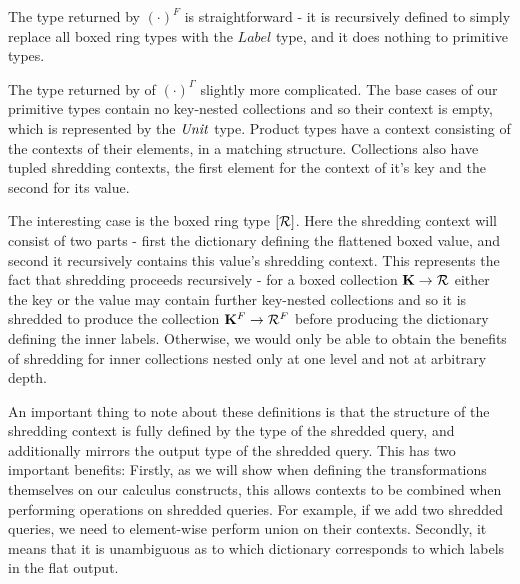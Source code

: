 {{{{The type returned by $(\cdot)^F$ is straightforward - it is recursively defined to simply replace all boxed ring types with the $Label$ type, and it does nothing to primitive types.

The type returned by of $(\cdot)^\Gamma$ slightly more complicated. The base cases of our primitive types contain no key-nested collections and so their context is empty, which is represented by the $\textrm{\textit{Unit}}$ type. Product types have a context consisting of the contexts of their elements, in a matching structure. Collections also have tupled shredding contexts, the first element for the context of it's key and the second for its value.

The interesting case is the boxed ring type $[\mathcal{R}]$. Here the shredding context will consist of two parts - first the dictionary defining the flattened boxed value, and second it recursively contains this value's shredding context. This represents the fact that shredding proceeds recursively - for a boxed collection $\mathbf{K} \rightarrow \mathcal{R}$ either the key or the value may contain further key-nested collections and so it is shredded to produce the collection $\mathbf{K}^F \rightarrow \mathcal{R}^F$ before producing the dictionary defining the inner labels. Otherwise, we would only be able to obtain the benefits of shredding for inner collections nested only at one level and not at arbitrary depth.

An important thing to note about these definitions is that the structure of the shredding context is fully defined by the type of the shredded query, and additionally mirrors the output type of the shredded query. This has two important benefits: Firstly, as we will show when defining the transformations themselves on our calculus constructs, this allows contexts to be combined when performing operations on shredded queries. For example, if we add two shredded queries, we need to element-wise perform union on their contexts. Secondly, it means that it is unambiguous as to which dictionary corresponds to which labels in the flat output.

}}}}
